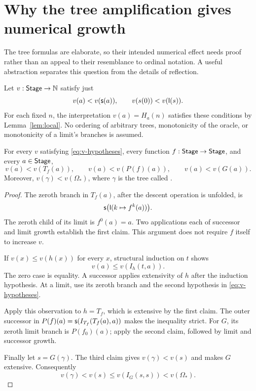\section{Why the tree amplification gives numerical growth}\label{sec:growth}
The tree formulas are elaborate, so their intended numerical effect needs
proof rather than an appeal to their resemblance to ordinal notation.
A useful abstraction separates this question from the details of reflection.

Let \(v:\mathsf{Stage}\to\mathbb N\) satisfy just
\begin{equation}\label{eq:v-hypotheses}
 v(a)<v(\mathsf s(a)),\qquad v(s(0))<v(\mathsf l(s)).
\end{equation}
For each fixed \(n\), the interpretation \(v(a)=H_a(n)\) satisfies
these conditions by Lemma~\ref{lem:local}. No ordering of arbitrary
trees, monotonicity of the oracle, or monotonicity of a limit's branches
is assumed.

\begin{theorem}\label{thm:amplification}
For every \(v\) satisfying \eqref{eq:v-hypotheses}, every function
\(f:\mathsf{Stage}\to\mathsf{Stage}\), and every \(a\in\mathsf{Stage}\),
\[
 v(a)<v(T_f(a)),\qquad v(a)<v(P(f)(a)),\qquad v(a)<v(G(a)).
\]
Moreover, \(v(\gamma)<v(\Omega_*)\), where \(\gamma\) is the tree called
.
\end{theorem}
\begin{proof}
The zeroth branch in \(T_f(a)\), after the descent operation is unfolded,
is
\[
                  \mathsf s\bigl(\mathsf l(k\mapsto f^k(a))\bigr).
\]
The zeroth child of its limit is \(f^0(a)=a\). Two applications each
of successor and limit growth establish the first claim. This argument
does not require \(f\) itself to increase \(v\).

If \(v(x)\le v(h(x))\) for every \(x\), structural induction on \(t\)
shows
\[
                         v(a)\le v(I_h(t,a)).
\]
The zero case is equality. A successor applies extensivity of \(h\)
after the induction hypothesis. At a limit, use its zeroth branch
and the second hypothesis in \eqref{eq:v-hypotheses}.

Apply this observation to \(h=T_f\), which is extensive by the first
claim. The outer successor in
\(P(f)(a)=\mathsf s(I_{T_f}(T_f(a),a))\) makes the inequality strict.
For \(G\), its zeroth limit branch is \(P(f_0)(a)\); apply the second
claim, followed by limit and successor growth.

Finally let \(s=G(\gamma)\). The third claim gives \(v(\gamma)<v(s)\)
and makes \(G\) extensive. Consequently
\[
             v(\gamma)<v(s)\le v(I_G(s,s))<v(\Omega_*).
\]
\end{proof}

